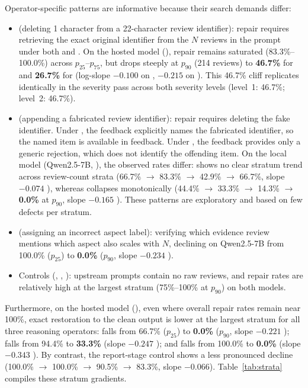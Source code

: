 Operator-specific patterns are informative because their search demands differ:
\begin{itemize}
\item {} (deleting 1 character from a 22-character review identifier):
  repair requires retrieving the exact original identifier from the $N$ reviews
  in the prompt under both  and . On the hosted model
  (), repair remains saturated (83.3\%--100.0\%) across $p_{25}$--$p_{75}$,
  but drops steeply at $p_{90}$ (214 reviews) to \textbf{46.7\%} for 
  and \textbf{26.7\%} for  (log-slope $-0.100$  on
  , $-0.215$  on ). This 46.7\% cliff
  replicates identically in the  severity pass across both severity
  levels (level~1: 46.7\%; level~2: 46.7\%).
\item {} (appending a fabricated review identifier): repair requires
  deleting the fake identifier. Under , the feedback explicitly names the
  fabricated identifier, so the named item is available in feedback. Under
  , the feedback provides only a generic rejection, which does not identify the offending item. On the local model
  (Qwen2.5-7B, ), the observed rates differ:  shows no clear stratum trend
  across review-count strata (66.7\% $\rightarrow$ 83.3\% $\rightarrow$ 42.9\%
  $\rightarrow$ 66.7\%, slope $-0.074$ ), whereas 
  collapses monotonically (44.4\% $\rightarrow$ 33.3\% $\rightarrow$ 14.3\%
  $\rightarrow$ \textbf{0.0\%} at $p_{90}$, slope $-0.165$ ).
  These patterns are exploratory and based on few defects per stratum.
\item {} (assigning an incorrect aspect label): verifying which evidence
  review mentions which aspect also scales with $N$, declining on Qwen2.5-7B
  from 100.0\% ($p_{25}$) to \textbf{0.0\%} ($p_{90}$, slope $-0.234$
  ).
\item Controls (, , ): upstream prompts contain no raw
  reviews, and repair rates are relatively high at the largest stratum
  (75\%--100\% at $p_{90}$) on both models.
\end{itemize}

\noindent Furthermore, on the hosted model (), even where overall
repair rates remain near 100\%, exact restoration to the clean output
is lower at the largest stratum for all three reasoning operators:
 falls from 66.7\% ($p_{25}$) to \textbf{0.0\%} ($p_{90}$, slope $-0.221$
);  falls from 94.4\% to \textbf{33.3\%} (slope
$-0.247$ ); and  falls from 100.0\% to \textbf{0.0\%}
(slope $-0.343$ ). By contrast, the report-stage control
 shows a less pronounced decline (100.0\% $\rightarrow$ 100.0\% $\rightarrow$ 90.5\%
$\rightarrow$ 83.3\%, slope $-0.066$).
Table~\ref{tab:strata} compiles these stratum gradients.

